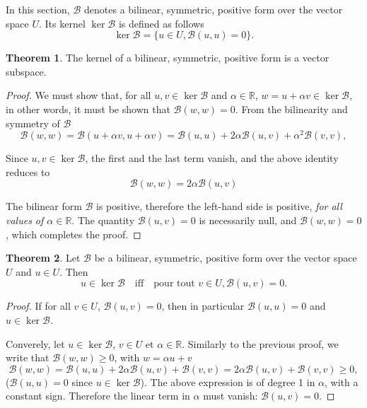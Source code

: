 \documentclass[12pt, final]{scrartcl}
\theoremstyle{definition}
\newtheorem{theorem}{Theorem}
\newcommand{\reals}{\mathbb{R}}
\begin{document}
In this section, $\mathcal{B}$ denotes a bilinear, symmetric, positive form over the vector space $U$. Its kernel
$\ker \mathcal{B}$ is defined as follows
\begin{equation}
 \ker \mathcal{B}= \bigl\{ u \in U, \mathcal{B}(u, u) = 0 \bigr\} .
\end{equation}

\begin{theorem}
  The kernel of a bilinear, symmetric, positive form is a vector subspace.
\end{theorem}
\begin{proof}
  We must show that, for all $u, v \in\ker \mathcal{B}$ and $\alpha \in \reals$,
  $w = u + \alpha v \in \ker \mathcal{B}$, in other words, it must be shown that $\mathcal{B}(w, w) = 0$. From the
  bilinearity and symmetry of $\mathcal{B}$
 \begin{equation*}
   \mathcal{B}(w, w) = \mathcal{B}(u + \alpha v, u + \alpha v)
   = \mathcal{B}(u, u) + 2 \alpha \mathcal{B}(u, v) + \alpha^2 \mathcal{B}(v, v),
 \end{equation*}

 Since $u, v \in \ker\mathcal{B}$, the first and the last term vanish, and the above identity reduces to
 \begin{equation*}
   \mathcal{B}(w, w) = 2\alpha \mathcal{B}(u, v)
 \end{equation*}

 The bilinear form $\mathcal{B}$ is positive, therefore the left-hand side is positive, \emph{for all values of
   $\alpha \in \reals$}. The quantity $\mathcal{B}(u, v) = 0$ is necessarily null, and $\mathcal{B}(w, w) = 0$, which
 completes the proof.
\end{proof}

\begin{theorem}
  Let $\mathcal{B}$ be a bilinear, symmetric, positive form over the vector space $U$ and $u \in U$. Then
 \begin{equation*}
  u \in \ker\mathcal{B} \quad \text{iff} \quad \text{pour tout } v \in U, \mathcal{B}(u, v) = 0.
 \end{equation*}
\end{theorem}

\begin{proof}
  If for all $v \in U$, $\mathcal{B}(u, v) = 0$, then in particular $\mathcal{B}(u, u) = 0$ and
  $u \in \ker \mathcal{B}$.

  Converely, let $u \in \ker \mathcal{B}$, $v \in U$ et $\alpha \in \reals$. Similarly to the previous proof, we write
  that $\mathcal{B}(w, w) \geq 0$, with $w = \alpha u + v$
  \begin{equation*}
    \mathcal{B}(w, w) = \mathcal{B}(u, u) + 2 \alpha \mathcal{B}(u, v) +\mathcal{B}(v, v) = 2 \alpha \mathcal{B}(u, v) +\mathcal{B}(v, v) \geq 0,
  \end{equation*}
  ($\mathcal{B}(u, u) = 0$ since $u \in \ker \mathcal{B}$). The above expression is of degree 1 in $\alpha$, with a
  constant sign. Therefore the linear term in $\alpha$ must vanish: $\mathcal{B}(u, v) = 0$.
\end{proof}
\end{document}
